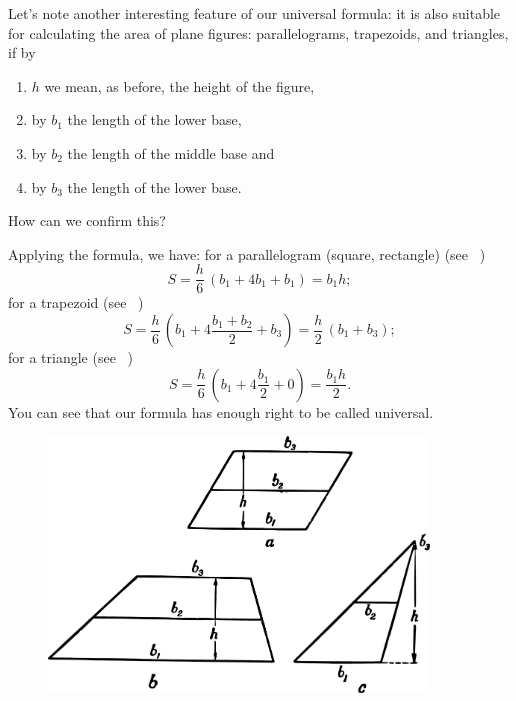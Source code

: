 \ques Let's note another interesting feature of our universal formula: it is also suitable for calculating the area of plane figures: parallelograms, trapezoids, and triangles, if by 
\begin{enumerate}[label=\textsection]
\item \( h \) we mean, as before, the height of the figure, 
\item by \( b_{1} \) the length of the lower base, 
\item by \( b_{2} \) the length of the middle base and 
\item by $b_{3}$ the length of the lower base. 
\end{enumerate}
How can we confirm this?

\ans Applying the formula, we have: for a parallelogram (square, rectangle) (see ~)
\begin{equation*}%
S = \frac{h}{6}\, (b_{1} + 4 b_{1} + b_{1}) = b_{1}h;
\end{equation*}
for a trapezoid (see ~)
\begin{equation*}%
S = \frac{h}{6}\, \left( b_{1} + 4 \frac{b_{1} + b_{2}}{2} + b_{3} \right) = \frac{h}{2}\,(b_{1} + b_{3});
\end{equation*}
for a triangle (see ~)
\begin{equation*}%
S = \frac{h}{6}\, \left( b_{1} + 4 \frac{b_{1}}{2} + 0 \right) = \frac{b_{1}h}{2}.
\end{equation*}
You can see that our formula has enough right to be called universal.

\begin{figure}[h!]
\centering
\includegraphics[width=0.9\textwidth]{figures/ch-01/fig-01-18.pdf}
\end{figure}


